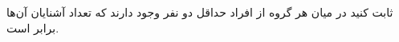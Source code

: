 \EXERCISE
ثابت کنید در میان هر گروه از افراد حداقل دو نفر وجود دارند که تعداد آشنایان آن‌ها برابر است.